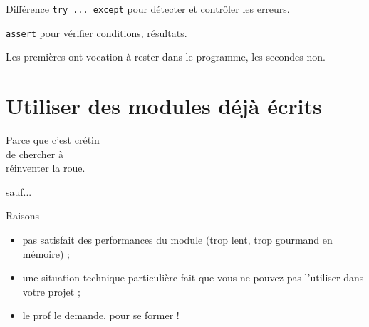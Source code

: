 \documentclass[10pt]{nsibeamer}
\begin{document}
\begin{frame}[fragile]{Différence}\pause
    \texttt{try ... except} pour détecter et contrôler les erreurs.\\\pause
    
    \texttt{assert} pour vérifier conditions, résultats.\\\pause

    Les premières ont vocation à rester dans le programme, les secondes non.
\end{frame}

\section{Utiliser des modules déjà écrits}

\begin{frame}[standout]
    Parce que c'est crétin\\
    de chercher à \\
    réinventer la roue.
\end{frame}

\begin{frame}[standout]
    sauf...    
\end{frame}

\begin{frame}[fragile]{Raisons}\pause
    \begin{itemize}
        \item   pas satisfait des performances du module (trop lent, trop gourmand en mémoire) ;\pause
        \item   une situation technique particulière fait que vous ne pouvez pas l'utiliser dans votre projet ;\pause
        \item   le prof le demande, pour se former !
    \end{itemize}
        
\end{frame}
\end{document}
